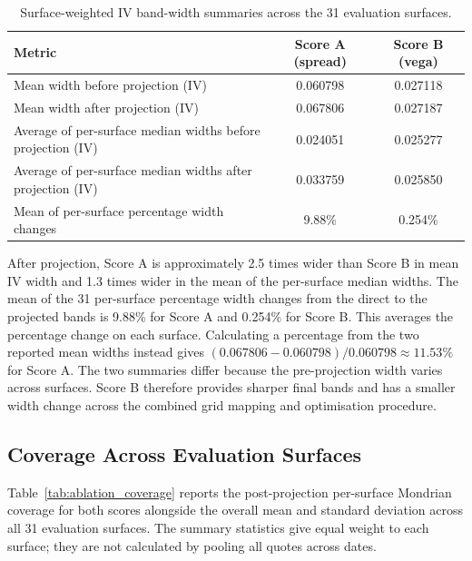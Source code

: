 \begin{table}[H]
\centering
\small
\begin{tabularx}{\textwidth}{|>{\raggedright\arraybackslash}X|c|c|}
\hline
\textbf{Metric} & \textbf{Score A (spread)} & \textbf{Score B (vega)} \\
\hline
Mean width before projection (IV)       & 0.060798 & 0.027118 \\
Mean width after projection (IV)        & 0.067806 & 0.027187 \\
Average of per-surface median widths before projection (IV) & 0.024051 & 0.025277 \\
Average of per-surface median widths after projection (IV) & 0.033759 & 0.025850 \\
Mean of per-surface percentage width changes & 9.88\%   & 0.254\%   \\
\hline
\end{tabularx}
\caption{Surface-weighted IV band-width summaries across the 31 evaluation surfaces.}
\label{tab:ablation_width}
\end{table}

After projection, Score A is approximately 2.5 times wider than Score B in mean IV width and 1.3 times wider in the mean of the per-surface median widths. The mean of the 31 per-surface percentage width changes from the direct to the projected bands is 9.88\% for Score A and 0.254\% for Score B. This averages the percentage change on each surface. Calculating a percentage from the two reported mean widths instead gives $(0.067806-0.060798)/0.060798\approx11.53\%$ for Score A. The two summaries differ because the pre-projection width varies across surfaces. Score B therefore provides sharper final bands and has a smaller width change across the combined grid mapping and optimisation procedure.

\subsection{Coverage Across Evaluation Surfaces}
\label{subsec:ablation_coverage}

Table~\ref{tab:ablation_coverage} reports the post-projection per-surface Mondrian coverage for both scores alongside the overall mean and standard deviation across all 31 evaluation surfaces. The summary statistics give equal weight to each surface; they are not calculated by pooling all quotes across dates.

